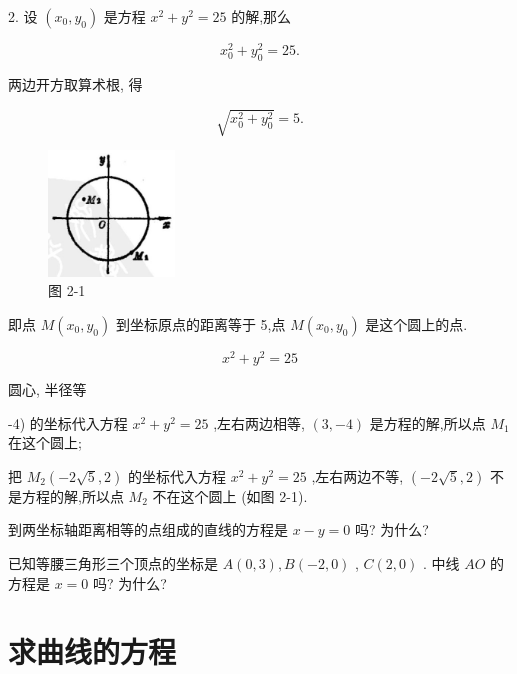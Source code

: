 \documentclass[lang=cn,newtx,10.5pt,scheme=chinese]{elegantbook}
\begin{document}
2. 设 \(\left( {{x}_{0},{y}_{0}}\right)\) 是方程 \({x}^{2} + {y}^{2} = {25}\) 的解,那么

\[
    {x}_{0}^{2} + {y}_{0}^{2} = {25}\text{.}
\]

两边开方取算术根, 得

\[
  \sqrt{{x}_{0}^{2} + {y}_{0}^{2}} = 5\text{.}
\]

\begin{figure}[h]
  \centering
  \includegraphics[max width=0.3\textwidth]{images/01912cc2-ffb6-728e-9ae7-b113ff05c64b_66_677276.jpg}
  \caption{图 2-1}
\end{figure}



即点 \(M\left( {{x}_{0},{y}_{0}}\right)\) 到坐标原点的距离等于 5,点 \(M\left( {{x}_{0},{y}_{0}}\right)\) 是这个圆上的点.

\[
    {x}^{2} + {y}^{2} = {25}
\]

圆心, 半径等

-4) 的坐标代入方程 \({x}^{2} + {y}^{2} = {25}\) ,左右两边相等, \(\left( {3, - 4}\right)\) 是方程的解,所以点 \({M}_{1}\) 在这个圆上;

把 \({M}_{2}\left( {-2\sqrt{5},2}\right)\) 的坐标代入方程 \({x}^{2} + {y}^{2} = {25}\) ,左右两边不等, \(\left( {-2\sqrt{5},2}\right)\) 不是方程的解,所以点 \({M}_{2}\) 不在这个圆上 (如图 2-1).

\begin{problemset}[练习]

\item 到两坐标轴距离相等的点组成的直线的方程是 \(x - y = 0\) 吗? 为什么?

\item 已知等腰三角形三个顶点的坐标是 \(A\left( {0,3}\right) ,B\left( {-2,0}\right)\) , \(C\left( {2,0}\right)\) . 中线 \({AO}\) 的方程是 \(x = 0\) 吗? 为什么?

\end{problemset}

\section{求曲线的方程}
\end{document}

